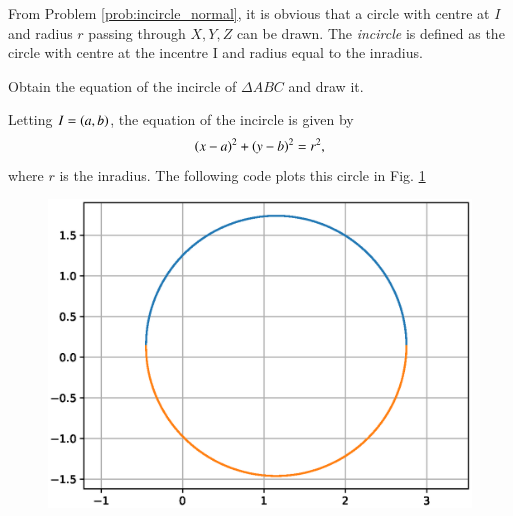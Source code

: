 \documentclass[journal,12pt,twocolumn]{IEEEtran}
\begin{document}
\begin{definition}
From Problem \ref{prob:incircle_normal}, it is obvious that  a circle with centre at $I$ and radius $r$ passing through $X, Y, Z$ can be drawn.  
The {\em incircle} is defined as the circle with centre at the incentre I and radius equal to the inradius.
\end{definition}
\begin{problem}
\label{prob:incircle}
Obtain the equation of the incircle of $\Delta ABC$ and draw it.
\end{problem}
%
\solution Letting $I = \left(a,b\right)$, the equation of the incircle is given by
%
\begin{equation}
\left(x-a\right)^2 + \left(y-b\right)^2 = r^2,
\end{equation}
%
where $r$ is the inradius.  The following code plots this circle in Fig. \ref{fig:incircle}

\begin{figure}[!h]
\centering
\includegraphics[width=\columnwidth]{./figs/incircle.eps}
\caption{}
\label{fig:incircle}
\end{figure}
%
\end{document}
